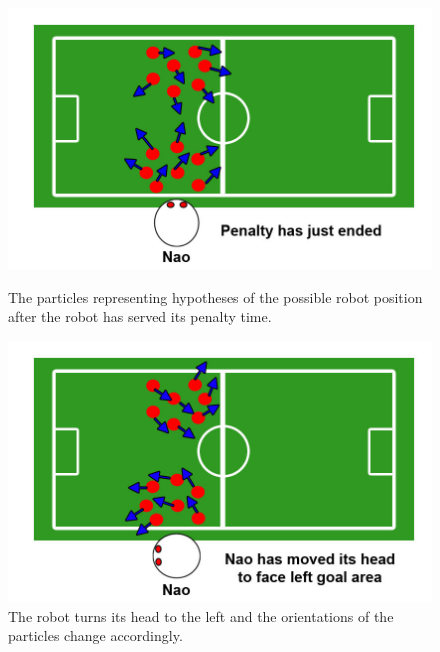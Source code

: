 \begin{figure}[ht!]
\begin{minipage}[b]{0.5\linewidth}
\includegraphics[scale=0.2]{../Drawings/localisation/localisationAlgorithmPenaltyEnded.jpg}
\caption{The particles representing hypotheses of the possible robot position after the robot has served its penalty time.}
\label{fig:penaltyOver}
\end{minipage}
\hspace{0.5cm}
\begin{minipage}[b]{0.5\linewidth}
\includegraphics[scale=0.2]{../Drawings/localisation/localisationAlgorithmTurnedLeft.jpg}
\caption{The robot turns its head to the left and the orientations of the particles change accordingly.}
\label{fig:turnedLeft}
\end{minipage}
\end{figure}

